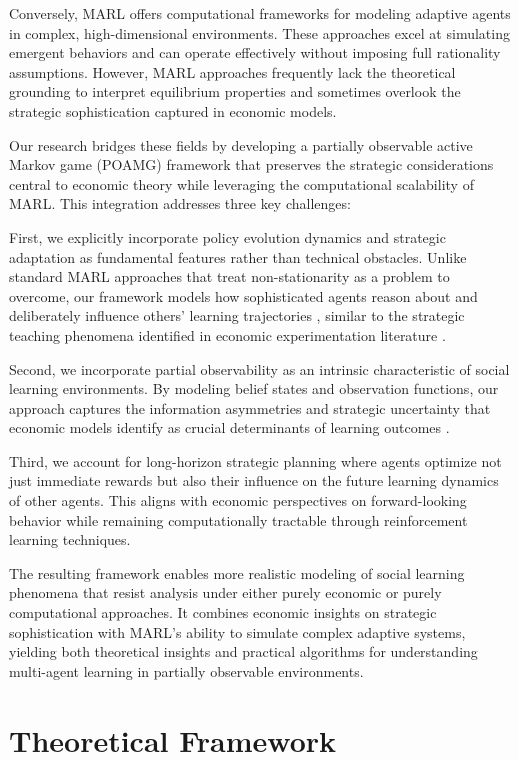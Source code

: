 \documentclass[a4paper,12pt]{report}
\begin{document}
Conversely, MARL offers computational frameworks for modeling adaptive agents in complex, high-dimensional environments. These approaches excel at simulating emergent behaviors and can operate effectively without imposing full rationality assumptions. However, MARL approaches frequently lack the theoretical grounding to interpret equilibrium properties and sometimes overlook the strategic sophistication captured in economic models.

Our research bridges these fields by developing a partially observable active Markov game (POAMG) framework that preserves the strategic considerations central to economic theory while leveraging the computational scalability of MARL. This integration addresses three key challenges:

First, we explicitly incorporate policy evolution dynamics and strategic adaptation as fundamental features rather than technical obstacles. Unlike standard MARL approaches that treat non-stationarity as a problem to overcome, our framework models how sophisticated agents reason about and deliberately influence others' learning trajectories \citep{kim2022influencing}, similar to the strategic teaching phenomena identified in economic experimentation literature \citep{yamamoto2019stochastic}.

Second, we incorporate partial observability as an intrinsic characteristic of social learning environments. By modeling belief states and observation functions, our approach captures the information asymmetries and strategic uncertainty that economic models identify as crucial determinants of learning outcomes \citep{heidhues2015strategic, rosenberg2009informational}.

Third, we account for long-horizon strategic planning where agents optimize not just immediate rewards but also their influence on the future learning dynamics of other agents. This aligns with economic perspectives on forward-looking behavior while remaining computationally tractable through reinforcement learning techniques.

The resulting framework enables more realistic modeling of social learning phenomena that resist analysis under either purely economic or purely computational approaches. It combines economic insights on strategic sophistication with MARL's ability to simulate complex adaptive systems, yielding both theoretical insights and practical algorithms for understanding multi-agent learning in partially observable environments.

\chapter{Theoretical Framework}
\end{document}
